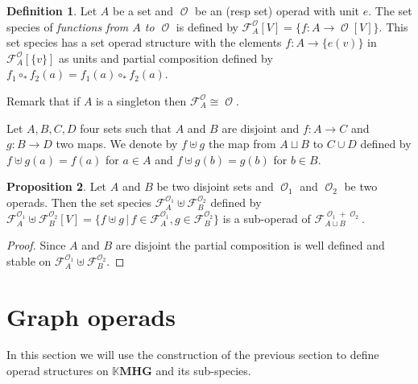 \documentclass[a4paper]{article}
\DeclareMathOperator{\op}{\mathcal{O}}
\theoremstyle{definition}
\newtheorem{definition}{Definition}
\newtheorem{proposition}[definition]{Proposition}
\newcommand{\K}{\mathbb{K}}
\newcommand{\MHG}{\mathbf{MHG}}
\begin{document}

\begin{definition}
Let $A$ be a set and $\op$ be an (resp set) operad with unit $e$. 
The set species of \textit{functions from $A$ to $\op$} is defined by 
$\mathcal{F}_A^{\op}[V] = \{f:A\rightarrow \op[V]\}$. This set species has 
a set operad structure with the elements $f:A \rightarrow \{e(v)\}$ in 
$\mathcal{F}_A^{\op}[\{v\}]$ as units and partial composition defined by 
$f_1\circ_{\ast} f_2(a) = f_1(a)\circ_{\ast} f_2(a)$.
\end{definition}

Remark that if $A$ is a singleton then $\mathcal{F}_A^{\op} \cong \op$.

Let $A,B,C,D$ four sets such that $A$ and $B$ are disjoint and $f:A\rightarrow C$ 
and $g:B\rightarrow D$ two maps. We denote by $f\uplus g$ the map from $A\sqcup B$ 
to $C\cup D$ defined by $f\uplus g(a) = f(a)$ for $a\in A$ and $f\uplus g(b) = g(b)$ 
for $b\in B$. 

\begin{proposition}
	Let $A$ and $B$ be two disjoint sets and $\op_1$ and $\op_2$ be two operads. 
	Then the set species $\mathcal{F}_A^{\op_1}\uplus\mathcal{F}_B^{\op_2}$ defined by 
	$\mathcal{F}_A^{\op_1}\uplus\mathcal{F}_B^{\op_2}[V] = \{f\uplus g\,|\, f\in\mathcal{F}_A^{\op_1}, g\in\mathcal{F}_B^{\op_2}\}$ 
	is a sub-operad of $\mathcal{F}_{A\sqcup B}^{\op_1+\op_2}$.
\end{proposition}

\begin{proof}
Since $A$ and $B$ are disjoint the partial composition is well defined and 
stable on $\mathcal{F}_A^{\op_1}\uplus\mathcal{F}_B^{\op_2}$.
\end{proof}


\section{Graph operads}\label{sec:graph_operads}
In this section we will use the construction of the previous section to define operad 
structures on $\K \MHG$ and its sub-species.
\end{document}
